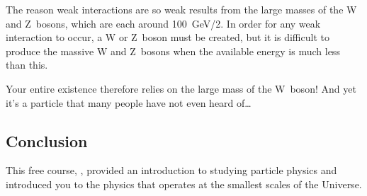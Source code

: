 \documentclass[letterpaper,10pt,english]{sphinxmanual}
\begin{document}
The reason weak interactions are so weak results from the large masses of the W and Z bosons, which are each around 100 GeV/2. In order for any weak interaction to occur, a W or Z boson must be created, but it is difficult to produce the massive W and Z bosons when the available energy is much less than this.

Your entire existence therefore relies on the large mass of the W boson! And yet it’s a particle that many people have not even heard of…


\subsection{Conclusion}
\label{\detokenize{content/session_00/Part_00_09:Conclusion}}\label{\detokenize{content/session_00/Part_00_09::doc}}
This free course, , provided an introduction to studying particle physics and introduced you to the physics that operates at the smallest scales of the Universe.
\end{document}
